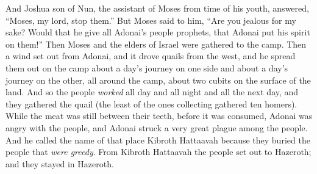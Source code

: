 \begin{biblechapter}
\verse And Joshua son of Nun, the assistant of Moses from time of his youth, answered, “Moses, my lord, stop them.”
\verse But Moses said to him, “Are you jealous for my sake? Would that he give all Adonai’s people prophets, that Adonai put his spirit on them!”
\verse Then Moses and the elders of Israel were gathered to the camp.
 Then a wind set out from Adonai, and it drove quails from the west, and he spread them out on the camp about a day’s journey on one side and about a day’s journey on the other, all around the camp, about two cubits on the surface of the land.
\verse And so the people \textit{worked} all day and all night and all the next day, and they gathered the quail (the least of the ones collecting gathered ten homers).
\verse While the meat was still between their teeth, before it was consumed, Adonai was angry with the people, and Adonai struck a very great plague among the people.
\verse And he called the name of that place Kibroth Hattaavah because they buried the people that \textit{were greedy}.
\verse From Kibroth Hattaavah the people set out to Hazeroth; and they stayed in Hazeroth.
\end{biblechapter}

